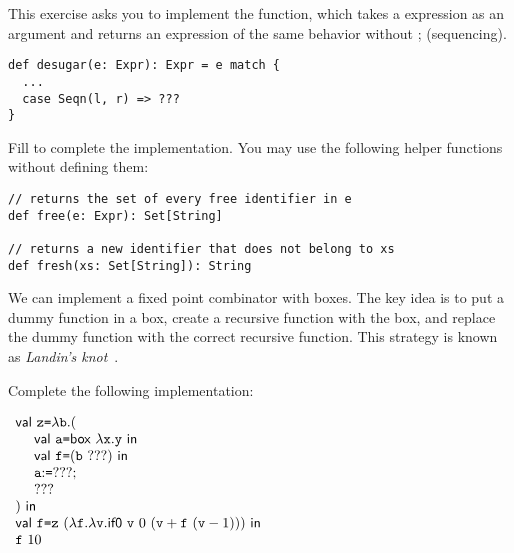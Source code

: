 \begin{exercise}

This exercise asks you to implement the  function, which
takes a \lang expression as an argument and returns an expression of the same
behavior without \textsf{;} (sequencing).

\begin{verbatim}
def desugar(e: Expr): Expr = e match {
  ...
  case Seqn(l, r) => ???
}
\end{verbatim}

Fill  to complete the implementation.
You may use the following helper functions without defining them:
\begin{verbatim}
// returns the set of every free identifier in e
def free(e: Expr): Set[String]

// returns a new identifier that does not belong to xs
def fresh(xs: Set[String]): String
\end{verbatim}

\end{exercise}

\begin{exercise}

We can implement a fixed point combinator with boxes. The key idea is to put a
dummy function in a box, create a recursive function with the box, and replace
the dummy function with the correct recursive function. This strategy is
known as \textit{Landin's knot}~\cite{landin1964mechanical}.

Complete the following implementation:

$\begin{array}{l}
  \textsf{val}\ \texttt{z}\texttt{=}\lambda\texttt{b}.(\\
  \ \ \ \ \textsf{val}\ \texttt{a}\texttt{=}\textsf{box}\ \lambda\texttt{x}.\texttt{y}\ \textsf{in}\ \\
  \ \ \ \ \textsf{val}\ \texttt{f}\texttt{=}(\texttt{b}\ ???)\ \textsf{in}\ \\
  \ \ \ \ \texttt{a}{:}\texttt{=}???;\\
  \ \ \ \ ???\\
 )\ \textsf{in}\ \\
  \textsf{val}\ \texttt{f}\texttt{=}\texttt{z}\ (\lambda\texttt{f}.\lambda\texttt{v}.\textsf{if0}\ \texttt{v}\ 0\ (\texttt{v}+\texttt{f}\ (\texttt{v}-1)))\ \textsf{in}\ \\
  \texttt{f}\ 10
\end{array}$

\end{exercise}
